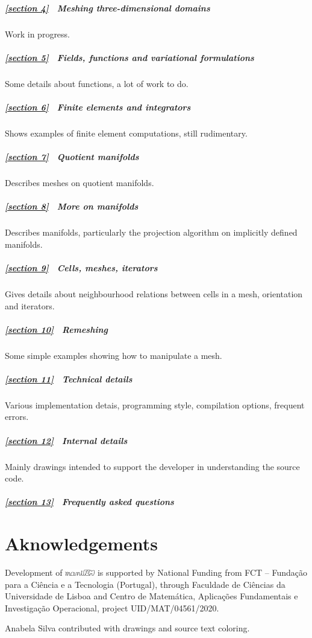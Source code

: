 \documentclass[a4paper]{scrreprt}
\def\numb{}
\newcommand\maniFEM{\leavevmode\hbox{\includegraphics[width=13mm]{manifem-small}}}
\newcommand\cinza[1]{\textcolor{coment}{#1}}
\begin{document}
\subparagraph*{\ref{\numb section 4} \ \cinza{Meshing three-dimensional domains}}
Work in progress.

\subparagraph*{\ref{\numb section 5} \ Fields, functions and variational formulations}
Some details about functions, a lot of work to do.

\subparagraph*{\ref{\numb section 6} \ Finite elements and integrators}
Shows examples of finite element computations, still rudimentary.

\subparagraph*{\ref{\numb section 7} \ Quotient manifolds}
Describes meshes on quotient manifolds.

\subparagraph*{\ref{\numb section 8} \ More on manifolds}
Describes manifolds, particularly the projection algorithm on implicitly defined manifolds.

\subparagraph*{\ref{\numb section 9} \ Cells, meshes, iterators}
Gives details about neighbourhood relations between cells in a mesh, orientation and iterators.

\subparagraph*{\ref{\numb section 10} \ Remeshing}
Some simple examples showing how to manipulate a mesh.

\subparagraph*{\ref{\numb section 11} \ Technical details}
Various implementation detais, programming style, compilation options, frequent errors.

\subparagraph*{\ref{\numb section 12} \ Internal details}
Mainly drawings intended to support the developer in understanding the source code.

\subparagraph*{\ref{\numb section 13} \ Frequently asked questions}


\section*{Aknowledgements}

Development of {\maniFEM} is supported by National Funding from FCT -- Funda\c c\~ao
para a Ci\^encia e a Tecnologia (Portugal), through Faculdade de Ci\^encias da Universidade
de Lisboa and Centro de Matem\'atica, Aplica\c c\~oes Fundamentais e Investiga\c c\~ao
Operacional, project UID/MAT/04561/2020.

Anabela Silva contributed with drawings and source text coloring.




\end{document}
